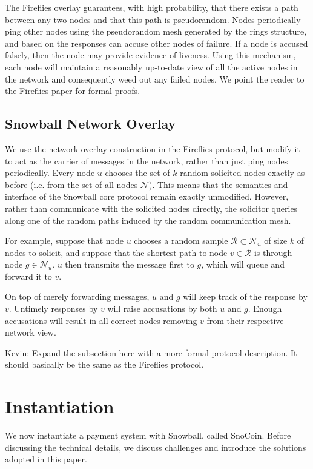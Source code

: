 The Fireflies overlay guarantees, with high probability, that there exists a path between any two nodes and that this path is pseudorandom. 
Nodes periodically ping other nodes using the pseudorandom mesh generated by the rings structure, and based on the responses can accuse other nodes of failure. 
If a node is accused falsely, then the node may provide evidence of liveness. 
Using this mechanism, each node will maintain a reasonably up-to-date view of all the active nodes in the network and consequently weed out any failed nodes.  
We point the reader to the Fireflies paper for formal proofs.

\subsection{Snowball Network Overlay}
We use the network overlay construction in the Fireflies protocol, but modify it to act as the carrier of messages in the network, rather than just ping nodes periodically.
Every node $u$ chooses the set of $k$ random solicited nodes exactly as before (i.e. from the set of all nodes $\mathcal{N}$). 
This means that the semantics and interface of the Snowball core protocol remain exactly unmodified. 
However, rather than communicate with the solicited nodes directly, the solicitor queries along one of the random paths induced by the random communication mesh. 

For example, suppose that node $u$ chooses a random sample $\mathcal{R} \subset \mathcal{N}_u$ of size $k$ of nodes to solicit, and suppose that the shortest path to node $v \in \mathcal{R}$ is through node $g \in \mathcal{N}_u$. 
$u$ then transmits the message first to $g$, which will queue and forward it to $v$. 

On top of merely forwarding messages, $u$ and $g$ will keep track of the response by $v$. Untimely responses by $v$ will raise accusations by both $u$ and $g$. Enough accusations will result in all correct nodes removing $v$ from their respective network view. 

{\color{blue} Kevin: Expand the subsection here with a more formal protocol description. It should basically be the same as the Fireflies protocol. }

\section{Instantiation}
We now instantiate a payment system with Snowball, called SnoCoin. Before discussing the technical details, we discuss challenges and introduce the solutions adopted in this paper. 

